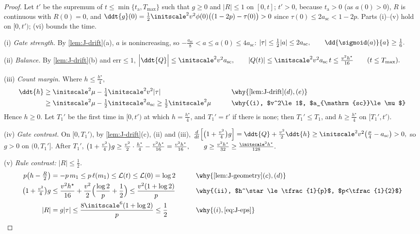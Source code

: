 \begin{proof}
Let $t'$ be the supremum of $t\le\min\{t_{\mathrm a},T_{\max}\}$ such that $g\ge0$ and $|R|\le1$ on $[0,t]$; $t'>0$, because $t_{\mathrm a}>0$ (as $a(0)>0$), $R$ is continuous with $R(0)=0$, and
$\ddt{g}(0)=\frac{1}{2}\initscale^2v^2\phi(0)\bigl((1-2p)-\tau(0)\bigr)>0$ since $\tau(0)\le2a_{\mathrm{sc}}<1-2p$. Parts (i)--(v) hold on $[0,t')$; (vi) bounds the time.

\smallskip\noindent(i) \emph{Gate strength.} By \cref{lem:J-drift}(a), $a$ is nonincreasing, so $-\frac{a_{\mathrm{sc}}}{8}<a\le a(0)\le4a_{\mathrm{sc}}$:
 $|\tau|\le\tfrac{1}{2}|a|\le2a_{\mathrm{sc}},\qquad \dd{\sigmoid(a)}{a}\ge\tfrac{1}{6}.$ 

\noindent(ii) \emph{Balance.} By \cref{lem:J-drift}(b) and $\mathrm{err}\le1$,
 $\Bigl|\ddt{Q}\Bigr|\le\initscale^2v^2a_{\mathrm{sc}},\qquad |Q(t)|\le\initscale^2v^2a_{\mathrm{sc}}\,t\le\frac{v^2h^\star}{16}\qquad(t\le T_{\max}).$ 

\noindent(iii) \emph{Count margin.} Where $h\le\frac{h^\star}{4}$,
\begin{alignat*}{2}
 \ddt{h}&\ge\initscale^2\mu-\tfrac{1}{4}\initscale^2v^2|\tau| &\qquad& \why{\cref{lem:J-drift}(d), (e)}\\
 &\ge\initscale^2\mu-\tfrac{1}{2}\initscale^2a_{\mathrm{sc}}\ge\tfrac{1}{2}\initscale^2\mu && \why{(i), $v^2\le1$, $a_{\mathrm{sc}}\le\mu$}
\end{alignat*}
Hence $h\ge0$. Let $T_1'$ be the first time in $[0,t')$ at which $h=\frac{h^\star}{4}$, and $T_1'=t'$ if there is none; then $T_1'\le T_1$, and $h\ge\frac{h^\star}{4}$ on
$[T_1',t')$.

\noindent(iv) \emph{Gate contrast.} On $[0,T_1')$, by \cref{lem:J-drift}(c), (ii) and (iii),
 $\frac{d}{dt}\Bigl[\bigl(1+\tfrac{v^2}{4}\bigr)g\Bigr]=\ddt{Q}+\frac{v^2}{2}\ddt{h}\ge\initscale^2v^2\bigl(\tfrac{\mu}{4}-a_{\mathrm{sc}}\bigr)>0,$ 
so $g>0$ on $(0,T_1']$. After $T_1'$,
 $\bigl(1+\tfrac{v^2}{4}\bigr)g\ge\frac{v^2}{2}\cdot\frac{h^\star}{4}-\frac{v^2h^\star}{16}=\frac{v^2h^\star}{16},\qquad g\ge\frac{v^2h^\star}{32}\ge\frac{\initscale^2h^\star}{128} .$ 

\noindent(v) \emph{Rule contrast: $|R|\le\frac{1}{2}$.}
\begin{alignat*}{2}
 p\bigl(h-\tfrac{R}{2}\bigr)&=-p\,m_1\le p\,\ell(m_1)\le\mathcal L(t)\le\mathcal L(0)=\log 2 &\qquad& \why{\cref{lem:J-geometry}(c), (d)}\\
 \bigl(1+\tfrac{v^2}{4}\bigr)g&\le\frac{v^2h^\star}{16}+\frac{v^2}{2}\Bigl(\frac{\log 2}{p}+\frac{1}{2}\Bigr)\le\frac{v^2(1+\log 2)}{p} && \why{(ii), $h^\star\le\tfrac{1}{p}$, $p<\tfrac{1}{2}$}\\
 |R|&=g|\tau|\le\frac{8\initscale^6(1+\log 2)}{p}\le\frac{1}{2} && \why{(i), \cref{eq:J-eps}}
\end{alignat*}


\end{proof}

